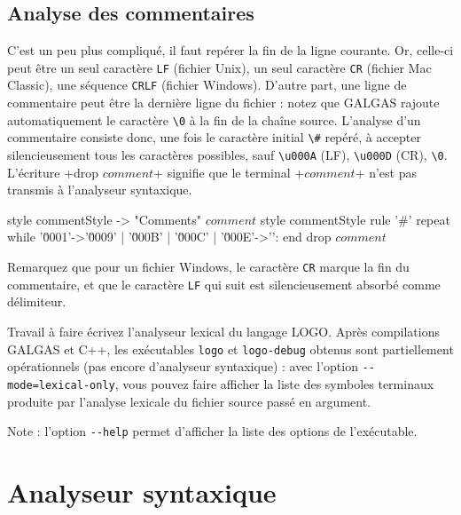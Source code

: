 \subsection{Analyse des commentaires}
C'est un peu plus compliqué, il faut repérer la fin de la ligne courante. Or, celle-ci peut être un seul caractère \texttt{LF} (fichier Unix), un seul caractère \texttt{CR} (fichier Mac Classic), une séquence \texttt{CRLF} (fichier Windows). D'autre part, une ligne de commentaire peut être la dernière ligne du fichier : notez que GALGAS rajoute automatiquement le caractère \texttt{\textquotesingle\textbackslash 0\textquotesingle} à la fin de la chaîne source. L'analyse d'un commentaire consiste donc, une fois le caractère initial \texttt{\textquotesingle\textbackslash\#\textquotesingle} repéré, à accepter silencieusement tous les caractères possibles, sauf \texttt{\textquotesingle\textbackslash u000A\textquotesingle} (LF), \texttt{\textquotesingle\textbackslash u000D\textquotesingle} (CR), \texttt{\textquotesingle\textbackslash0\textquotesingle}. L’écriture \ggs+drop $comment$+ signifie que le terminal \ggs+$comment$+ n’est pas transmis à l’analyseur syntaxique.

\begin{galgas}
style commentStyle -> "Comments"
$comment$ style commentStyle %
rule '#' {
  repeat
  while '\u0001'->'\u0009' | '\u000B' | '\u000C' | '\u000E'->'\uFFFD':
  end
  drop $comment$
}
\end{galgas}

Remarquez que pour un fichier Windows, le caractère \texttt{CR} marque la fin du commentaire, et que le caractère \texttt{LF} qui suit est silencieusement absorbé comme délimiteur.

Travail à faire
écrivez l'analyseur lexical du langage LOGO. Après compilations GALGAS et C++, les exécutables \texttt{logo} et \texttt{logo-debug} obtenus sont partiellement opérationnels (pas encore d’analyseur syntaxique) : avec l'option \texttt{-{}-mode=lexical-only}, vous pouvez faire afficher la liste des symboles terminaux produite par l'analyse lexicale du fichier source passé en argument.

Note : l'option \texttt{-{}-help} permet d'afficher la liste des options de l'exécutable. 

\section{Analyseur syntaxique}

